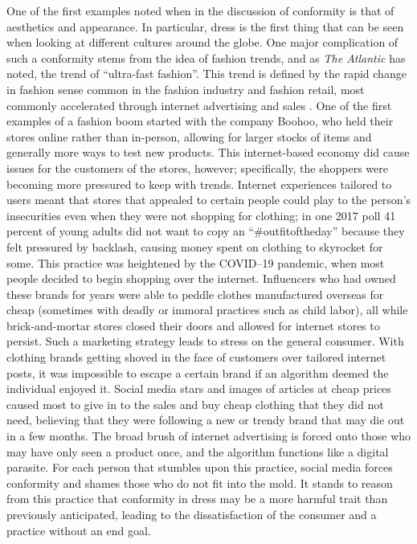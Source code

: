\documentclass[12pt,letterpaper]{report}
\begin{document}
  \par One of the first examples noted when in the discussion of conformity is that of aesthetics and appearance. In particular, dress is the first thing that can be seen when looking at different cultures around the globe. One major complication of such a conformity stems from the idea of fashion trends, and as \textit{The Atlantic} has noted, the trend of ``ultra-fast fashion''. This trend is defined by the rapid change in fashion sense common in the fashion industry and fashion retail, most commonly accelerated through internet advertising and sales \citep{RMonroe2021}. One of the first examples of a fashion boom started with the company Boohoo, who held their stores online rather than in-person, allowing for larger stocks of items and generally more ways to test new products. This internet-based economy did cause issues for the customers of the stores, however; specifically, the shoppers were becoming more pressured to keep with trends. Internet experiences tailored to users meant that stores that appealed to certain people could play to the person's insecurities even when they were not shopping for clothing; in one 2017 poll 41 percent of young adults did not want to copy an ``\#outfitoftheday'' because they felt pressured by backlash, causing money spent on clothing to skyrocket for some. This practice was heightened by the COVID--19 pandemic, when most people decided to begin shopping over the internet. Influencers who had owned these brands for years were able to peddle clothes manufactured overseas for cheap (sometimes with deadly or immoral practices such as child labor), all while brick-and-mortar stores closed their doors and allowed for internet stores to persist. Such a marketing strategy leads to stress on the general consumer. With clothing brands getting shoved in the face of customers over tailored internet posts, it was impossible to escape a certain brand if an algorithm deemed the individual enjoyed it. Social media stars and images of articles at cheap prices caused most to give in to the sales and buy cheap clothing that they did not need, believing that they were following a new or trendy brand that may die out in a few months. The broad brush of internet advertising is forced onto those who may have only seen a product once, and the algorithm functions like a digital parasite. For each person that stumbles upon this practice, social media forces conformity and shames those who do not fit into the mold. It stands to reason from this practice that conformity in dress may be a more harmful trait than previously anticipated, leading to the dissatisfaction of the consumer and a practice without an end goal.
\end{document}
